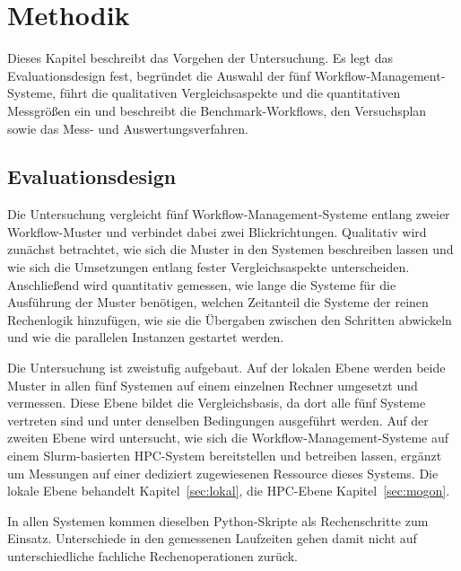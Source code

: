 
\lstset{breaklines=true, breakatwhitespace=false}

\chapter{Methodik}
\label{sec:methodik}

Dieses Kapitel beschreibt das Vorgehen der Untersuchung. Es legt das
Evaluationsdesign fest, begründet die Auswahl der fünf Workflow-Management-Systeme, führt die qualitativen Vergleichsaspekte und die quantitativen
Messgrößen ein und beschreibt die Benchmark-Workflows, den
Versuchsplan sowie das Mess- und Auswertungsverfahren.

\section{Evaluationsdesign}
\label{sec:methodik:design}

Die Untersuchung vergleicht fünf Workflow-Management-Systeme entlang
zweier Workflow-Muster und verbindet dabei zwei Blickrichtungen.
Qualitativ wird zunächst betrachtet, wie sich die Muster in den
Systemen beschreiben lassen und wie sich die Umsetzungen entlang
fester Vergleichsaspekte unterscheiden. Anschließend wird
quantitativ gemessen, wie lange die Systeme für die Ausführung der
Muster benötigen, welchen Zeitanteil die Systeme der reinen
Rechenlogik hinzufügen, wie sie die Übergaben zwischen den Schritten
abwickeln und wie die parallelen Instanzen gestartet werden.

Die Untersuchung ist zweistufig aufgebaut. Auf der lokalen Ebene
werden beide Muster in allen fünf Systemen auf einem einzelnen
Rechner umgesetzt und vermessen. Diese Ebene bildet die
Vergleichsbasis, da dort alle fünf Systeme vertreten sind und
unter denselben Bedingungen ausgeführt werden. Auf der zweiten Ebene wird untersucht, wie sich die Workflow-Management-Systeme auf einem Slurm-basierten HPC-System bereitstellen und
betreiben lassen, ergänzt um Messungen auf einer dediziert
zugewiesenen Ressource dieses Systems. Die lokale Ebene behandelt
Kapitel~\ref{sec:lokal}, die HPC-Ebene Kapitel~\ref{sec:mogon}.

In allen Systemen kommen dieselben Python-Skripte als Rechenschritte
zum Einsatz. Unterschiede in den gemessenen Laufzeiten gehen damit
nicht auf unterschiedliche fachliche Rechenoperationen zurück.


